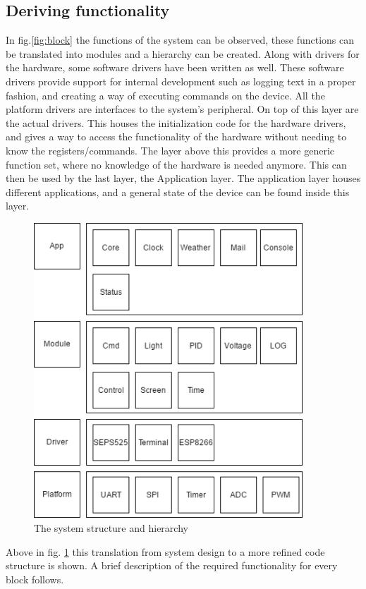 \subsection{Deriving functionality}
In fig.\ref{fig:block} the functions of the system can be observed, these functions can be translated into modules and a hierarchy can be created. Along with drivers for the hardware, some software drivers have been written as well. These software drivers provide support for internal development such as logging text in a proper fashion, and creating a way of executing commands on the device. All the platform drivers are interfaces to the system's peripheral. On top of this layer are the actual drivers. This houses the initialization code for the hardware drivers, and gives a way to access the functionality of the hardware without needing to know the registers/commands. The layer above this provides a more generic function set, where no knowledge of the hardware is needed anymore. This can then be used by the last layer, the Application layer. The application layer houses different applications, and a general state of the device can be found inside this layer.
\begin{figure}[H]
	\centering
	\label{fig:block_code}
	\includegraphics[width=0.9\textwidth]{fig/block_code.png}
	\caption{The system structure and hierarchy}
\end{figure}
Above in fig. \ref{fig:block_code} this translation from system design to a more refined code structure is shown. A brief description of the required functionality for every block follows. 

